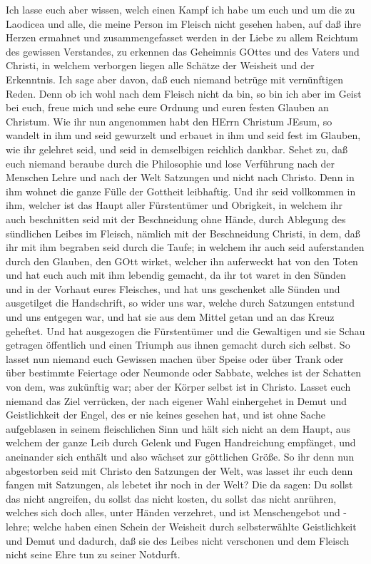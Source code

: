  Ich lasse euch aber wissen, welch einen Kampf ich habe um
euch und um die zu Laodicea und alle, die meine Person im Fleisch nicht
gesehen haben,  auf daß ihre Herzen ermahnet und
zusammengefasset werden in der Liebe zu allem Reichtum des gewissen
Verstandes, zu erkennen das Geheimnis GOttes und des Vaters und Christi,
 in welchem verborgen liegen alle Schätze der Weisheit und
der Erkenntnis.  Ich sage aber davon, daß euch niemand
betrüge mit vernünftigen Reden.  Denn ob ich wohl nach dem
Fleisch nicht da bin, so bin ich aber im Geist bei euch, freue mich und
sehe eure Ordnung und euren festen Glauben an Christum.  Wie
ihr nun angenommen habt den HErrn Christum JEsum, so wandelt in ihm
 und seid gewurzelt und erbauet in ihm und seid fest im
Glauben, wie ihr gelehret seid, und seid in demselbigen reichlich
dankbar.  Sehet zu, daß euch niemand beraube durch die
Philosophie und lose Verführung nach der Menschen Lehre und nach der
Welt Satzungen und nicht nach Christo.  Denn in ihm wohnet
die ganze Fülle der Gottheit leibhaftig.  Und ihr seid
vollkommen in ihm, welcher ist das Haupt aller Fürstentümer und
Obrigkeit,  in welchem ihr auch beschnitten seid mit der
Beschneidung ohne Hände, durch Ablegung des sündlichen Leibes im
Fleisch, nämlich mit der Beschneidung Christi,  in dem, daß
ihr mit ihm begraben seid durch die Taufe; in welchem ihr auch seid
auferstanden durch den Glauben, den GOtt wirket, welcher ihn auferweckt
hat von den Toten  und hat euch auch mit ihm lebendig
gemacht, da ihr tot waret in den Sünden und in der Vorhaut eures
Fleisches, und hat uns geschenket alle Sünden  und
ausgetilget die Handschrift, so wider uns war, welche durch Satzungen
entstund und uns entgegen war, und hat sie aus dem Mittel getan und an
das Kreuz geheftet.  Und hat ausgezogen die Fürstentümer
und die Gewaltigen und sie Schau getragen öffentlich und einen Triumph
aus ihnen gemacht durch sich selbst.  So lasset nun niemand
euch Gewissen machen über Speise oder über Trank oder über bestimmte
Feiertage oder Neumonde oder Sabbate,  welches ist der
Schatten von dem, was zukünftig war; aber der Körper selbst ist in
Christo.  Lasset euch niemand das Ziel verrücken, der nach
eigener Wahl einhergehet in Demut und Geistlichkeit der Engel, des er
nie keines gesehen hat, und ist ohne Sache aufgeblasen in seinem
fleischlichen Sinn  und hält sich nicht an dem Haupt, aus
welchem der ganze Leib durch Gelenk und Fugen Handreichung empfänget,
und aneinander sich enthält und also wächset zur göttlichen Größe.
 So ihr denn nun abgestorben seid mit Christo den Satzungen
der Welt, was lasset ihr euch denn fangen mit Satzungen, als lebetet ihr
noch in der Welt?  Die da sagen: Du sollst das nicht
angreifen, du sollst das nicht kosten, du sollst das nicht anrühren,
 welches sich doch alles, unter Händen verzehret, und ist
Menschengebot und - lehre;  welche haben einen Schein der
Weisheit durch selbsterwählte Geistlichkeit und Demut und dadurch, daß
sie des Leibes nicht verschonen und dem Fleisch nicht seine Ehre tun zu
seiner Notdurft.

